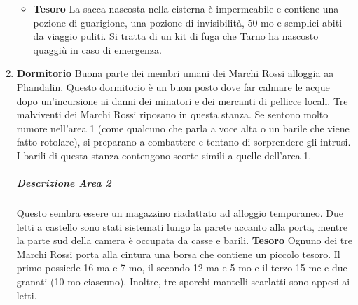 \documentclass{article}
\begin{document}
\begin{enumerate}
\begin{itemize}
\item \textbf{Tesoro} La sacca nascosta nella cisterna è impermeabile e contiene
una pozione di guarigione, una pozione di invisibilità, 50 mo
e semplici abiti da viaggio puliti. Si tratta di un kit di fuga che
Tarno ha nascosto quaggiù in caso di emergenza.
        \end{itemize}
\item \textbf{Dormitorio} 
    Buona parte dei membri umani dei Marchi Rossi alloggia
aa Phandalin. Questo dormitorio è un buon posto dove far
calmare le acque dopo un'incursione ai danni dei minatori e
dei mercanti di pellicce locali. Tre malviventi dei Marchi Rossi riposano in questa stanza.
Se sentono molto rumore nell’area 1 (come qualcuno che
parla a voce alta o un barile che viene fatto rotolare), si
preparano a combattere e tentano di sorprendere gli intrusi.
I barili di questa stanza contengono scorte simili a
quelle dell’area 1.

 \subparagraph{Descrizione Area 2} Questo sembra essere un magazzino riadattato ad alloggio
temporaneo. Due letti a castello sono stati sistemati lungo la
parete accanto alla porta, mentre la parte sud della camera è
occupata da casse e barili.
 \textbf{Tesoro} Ognuno dei tre Marchi Rossi porta alla cintura una borsa
che contiene un piccolo tesoro. Il primo possiede 16 ma e 7
mo, il secondo 12 ma e 5 mo e il terzo 15 me e due granati
(10 mo ciascuno). Inoltre, tre sporchi mantelli scarlatti sono
appesi ai letti.



\end{enumerate}
\end{document}
